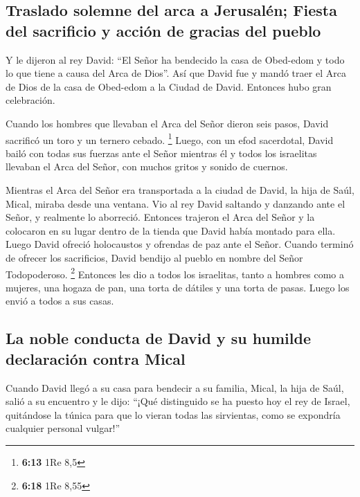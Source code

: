\hypertarget{traslado-solemne-del-arca-a-jerusaluxe9n-fiesta-del-sacrificio-y-acciuxf3n-de-gracias-del-pueblo}{%
\subsection{Traslado solemne del arca a Jerusalén; Fiesta del sacrificio
y acción de gracias del
pueblo}\label{traslado-solemne-del-arca-a-jerusaluxe9n-fiesta-del-sacrificio-y-acciuxf3n-de-gracias-del-pueblo}}

 Y le dijeron al rey David: ``El Señor ha bendecido la
casa de Obed-edom y todo lo que tiene a causa del Arca de Dios''. Así
que David fue y mandó traer el Arca de Dios de la casa de Obed-edom a la
Ciudad de David. Entonces hubo gran celebración.

 Cuando los hombres que llevaban el Arca del Señor dieron
seis pasos, David sacrificó un toro y un ternero cebado. \footnote{\textbf{6:13}
  1Re 8,5}  Luego, con un efod sacerdotal, David bailó
con todas sus fuerzas ante el Señor  mientras él y todos
los israelitas llevaban el Arca del Señor, con muchos gritos y sonido de
cuernos.

 Mientras el Arca del Señor era transportada a la ciudad
de David, la hija de Saúl, Mical, miraba desde una ventana. Vio al rey
David saltando y danzando ante el Señor, y realmente lo aborreció.
 Entonces trajeron el Arca del Señor y la colocaron en su
lugar dentro de la tienda que David había montado para ella. Luego David
ofreció holocaustos y ofrendas de paz ante el Señor. 
Cuando terminó de ofrecer los sacrificios, David bendijo al pueblo en
nombre del Señor Todopoderoso. \footnote{\textbf{6:18} 1Re 8,55}
 Entonces les dio a todos los israelitas, tanto a hombres
como a mujeres, una hogaza de pan, una torta de dátiles y una torta de
pasas. Luego los envió a todos a sus casas.

\hypertarget{la-noble-conducta-de-david-y-su-humilde-declaraciuxf3n-contra-mical}{%
\subsection{La noble conducta de David y su humilde declaración contra
Mical}\label{la-noble-conducta-de-david-y-su-humilde-declaraciuxf3n-contra-mical}}

 Cuando David llegó a su casa para bendecir a su familia,
Mical, la hija de Saúl, salió a su encuentro y le dijo: ``¡Qué
distinguido se ha puesto hoy el rey de Israel, quitándose la túnica para
que lo vieran todas las sirvientas, como se expondría cualquier personal
vulgar!''

